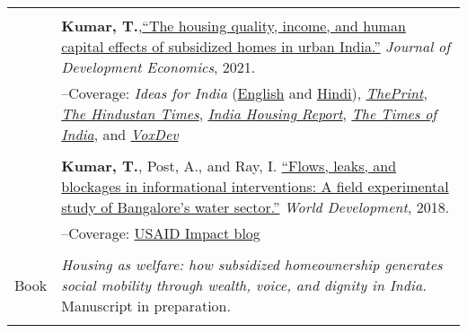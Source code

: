\documentclass[letterpaper, 10pt]{article}
\begin{document}
\begin{longtable}{p{1in}p{5.5in}}
& \\

&\textbf{Kumar, T.},\href{https://doi.org/10.1016/j.jdeveco.2021.102738}{``The housing quality, income, and human capital effects of subsidized homes in urban India.''} \textit{Journal of Development Economics}, 2021.\\

&--\indent Coverage: \textit{Ideas for India} (\href{https://www.ideasforindia.in/topics/poverty-inequality/household-level-effects-of-affordable-housing-evidence-from-mumbai.html}{English} and \href{https://www.ideasforindia.in/topics/poverty-inequality/household-level-effects-of-affordable-housing-evidence-from-mumbai-hindi.html}{Hindi}), \href{https://theprint.in/opinion/mumbai-residents-win-govt-housing-lottery-and-spend-more-on-kids-education-jobs-study/290485/}{\textit{ThePrint}}, \href{https://www.hindustantimes.com/opinion/housing-is-a-welfare-weapon-it-can-help-people-escape-poverty-101629993983576.html}{\textit{The Hindustan Times}}, \href{https://indiahousingreport.in/outputs/opinion/housing-is-a-welfare-weapon-it-can-help-people-escape-poverty/}{\textit{India Housing Report}}, \href{https://timesofindia.indiatimes.com/city/mumbai/mhada-home-winners-see-upswing-in-family-edu-pay-in-mumbai-study/articleshow/86468320.cms}{\textit{The Times of India}}, and \href{https://voxdev.org/topic/infrastructure-urbanisation/household-level-effects-subsidised-housing-evidence-urban-india?utm_source=dlvr.it&utm_medium=twitter}{\textit{VoxDev}} \\
& \\

&\textbf{Kumar, T.}, Post, A., and Ray, I. \href{https://www.sciencedirect.com/science/article/pii/S0305750X1830032}{``Flows, leaks, and blockages in informational interventions: A field experimental study of Bangalore's water sector.''} \textit{World Development}, 2018.\\

&--\indent Coverage: \href{https://blog.usaid.gov/2016/05/using-mobile-phones-to-alert-households-waiting-for-nextdrop-of-water/}{USAID Impact blog} \\
& \\

{{Book}} 
& \textit{Housing as welfare: how subsidized homeownership generates social mobility through wealth, voice, and dignity in India.} Manuscript in preparation. \\
& \\



\end{longtable}
\end{document}
